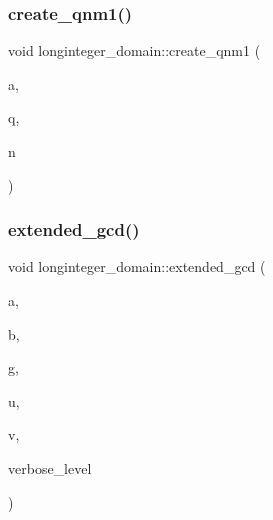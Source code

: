 \mbox{\label{classlonginteger__domain_a8d4b3ebcbc9af0e6516be0bd2743f61d}} 
\subsubsection{\texorpdfstring{create\+\_\+qnm1()}{create\_qnm1()}}
{\footnotesize\ttfamily void longinteger\+\_\+domain\+::create\+\_\+qnm1 (\begin{DoxyParamCaption}\item[{\mbox{\hyperlink{classlonginteger__object}{longinteger\+\_\+object}} \&}]{a,  }\item[{\mbox{\hyperlink{galois_8h_a09fddde158a3a20bd2dcadb609de11dc}{I\+NT}}}]{q,  }\item[{\mbox{\hyperlink{galois_8h_a09fddde158a3a20bd2dcadb609de11dc}{I\+NT}}}]{n }\end{DoxyParamCaption})}

\mbox{\label{classlonginteger__domain_ae208917d7c9de815f6579779f0ea6f7d}} 
\subsubsection{\texorpdfstring{extended\+\_\+gcd()}{extended\_gcd()}}
{\footnotesize\ttfamily void longinteger\+\_\+domain\+::extended\+\_\+gcd (\begin{DoxyParamCaption}\item[{\mbox{\hyperlink{classlonginteger__object}{longinteger\+\_\+object}} \&}]{a,  }\item[{\mbox{\hyperlink{classlonginteger__object}{longinteger\+\_\+object}} \&}]{b,  }\item[{\mbox{\hyperlink{classlonginteger__object}{longinteger\+\_\+object}} \&}]{g,  }\item[{\mbox{\hyperlink{classlonginteger__object}{longinteger\+\_\+object}} \&}]{u,  }\item[{\mbox{\hyperlink{classlonginteger__object}{longinteger\+\_\+object}} \&}]{v,  }\item[{\mbox{\hyperlink{galois_8h_a09fddde158a3a20bd2dcadb609de11dc}{I\+NT}}}]{verbose\+\_\+level }\end{DoxyParamCaption})}

